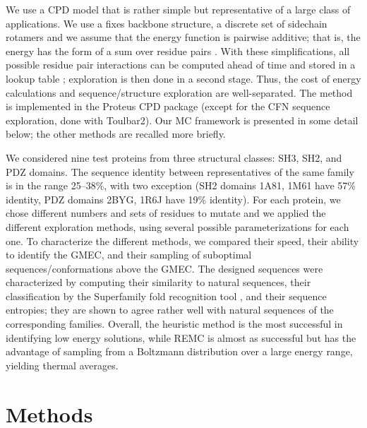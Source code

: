 We use a CPD model that is rather simple but representative of a large class of applications.
We use a fixes backbone structure, a discrete set of sidechain rotamers and we assume that the energy function is pairwise additive;
that is, the energy has the form of a sum over residue pairs \cite{Schmidt08b,Schmidt08,Simonson13b}.
With these simplifications, all possible residue pair interactions can be computed ahead of time and stored in a lookup table \cite{Dahiyat97}; exploration is then done in a second stage.
Thus, the cost of energy calculations and sequence/structure exploration are well-separated.
The method is implemented in the Proteus CPD package \cite{Schmidt08,Simonson13b} (except for the CFN sequence exploration, done with Toulbar2).
Our MC framework is presented in some detail below; the other methods are recalled more briefly.

We considered nine test proteins from three structural classes: SH3, SH2, and PDZ domains.
The sequence identity between representatives of the same family is in the range 25–38\%, with two exception (SH2 domains 1A81, 1M61 have 57\% identity, PDZ domains 2BYG, 1R6J have 19\% identity).
For each protein, we chose different numbers and sets of residues to mutate and we applied the different exploration methods, using several possible parameterizations for each one.
To characterize the different methods, we compared their speed, their ability to identify the GMEC, and their sampling of suboptimal sequences/conformations above the GMEC.
The designed sequences were characterized by computing their similarity to natural sequences, their classification
by the Superfamily fold recognition tool \cite{Gough01,Wilson07}, and their sequence entropies; they are shown to agree rather well with natural sequences of the corresponding families.
Overall, the heuristic method is the most successful in identifying low energy solutions, while REMC is almost as successful but has the advantage of sampling from a Boltzmann distribution over a large energy range, yielding thermal averages.

\section{Methods}
